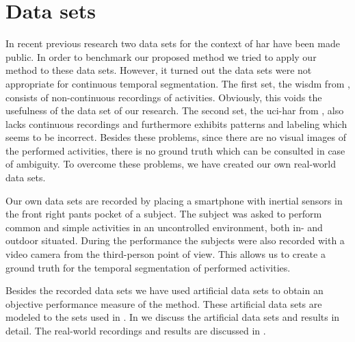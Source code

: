 \section{Data sets}
In recent previous research two data sets for the context of \gls{har} have been made public.
In order to benchmark our proposed method we tried to apply our method to these data sets.
However, it turned out the data sets were not appropriate for continuous temporal segmentation.
The first set, the \gls{wisdm} from \cite{kwapisz2011activity}, consists of non-continuous recordings of activities.
Obviously, this voids the usefulness of the data set of our research.
The second set, the \gls{uci-har} from \cite{anguita2012human}, also lacks continuous recordings and furthermore exhibits patterns and labeling which seems to be incorrect.
Besides these problems, since there are no visual images of the performed activities, there is no ground truth which can be consulted in case of ambiguity.
To overcome these problems, we have created our own real-world data sets.

Our own data sets are recorded by placing a smartphone with inertial sensors in the front right pants pocket of a subject.
The subject was asked to perform common and simple activities in an uncontrolled environment, both in- and outdoor situated.
During the performance the subjects were also recorded with a video camera from the third-person point of view.
This allows us to create a ground truth for the temporal segmentation of performed activities.

Besides the recorded data sets we have used artificial data sets to obtain an objective performance measure of the method.
These artificial data sets are modeled to the sets used in \cite{camci2010change,takeuchi2006unifying}.
In  we discuss the artificial data sets and results in detail.
The real-world recordings and results are discussed in .

